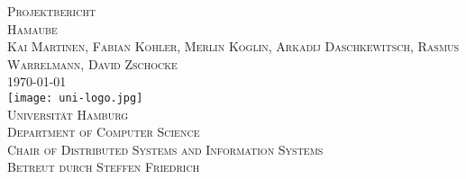 \begin{titlepage}
\begin{center}
	\vspace{6em}
	{\Large \textsc{Projektbericht}}\\
	\vspace{5em}
	{\huge \textsc{Hamaube}}\\
	\vspace{4em}
	{\Large \textsc{Kai Martinen, Fabian Kohler, Merlin Koglin, Arkadij Daschkewitsch, Rasmus Warrelmann, David Zschocke }}\\
	\vspace{3em}
	{\Large \textsc{\today}}\\
	\vspace{3em}
	\texttt{[image: uni-logo.jpg]}\\
	\vspace{3em}
	{\Large \textsc{Universität Hamburg}}\\
	\vspace{1em}
	{\Large \textsc{Department of Computer Science}}\\
	\vspace{1em}
	{\Large \textsc{Chair of Distributed Systems and Information Systems}}\\
	\vspace{2em}
	{\Large \textsc{Betreut durch Steffen Friedrich}}\\
	
\end{center}
\end{titlepage}